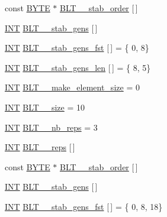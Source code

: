 \begin{DoxyCompactItemize}
\item 
const \mbox{\hyperlink{galois_8h_ab6cc7b4aeb6ea31aba2b3fbfc83ff5e6}{B\+Y\+TE}} $\ast$ \mbox{\hyperlink{data___b_l_t_8_c_ac40c9bb4cbdc0a4b06b5f1a78fd41d98}{B\+L\+T\+\_\+\_\+stab\+\_\+order}} \mbox{[}$\,$\mbox{]}
\item 
\mbox{\hyperlink{galois_8h_a09fddde158a3a20bd2dcadb609de11dc}{I\+NT}} \mbox{\hyperlink{data___b_l_t_8_c_a3fb92cc808370f49340f142bbf36ec7f}{B\+L\+T\+\_\+\_\+stab\+\_\+gens}} \mbox{[}$\,$\mbox{]}
\item 
\mbox{\hyperlink{galois_8h_a09fddde158a3a20bd2dcadb609de11dc}{I\+NT}} \mbox{\hyperlink{data___b_l_t_8_c_a8258b0ac3f8f81c167388f524f555fca}{B\+L\+T\+\_\+\_\+stab\+\_\+gens\+\_\+fst}} \mbox{[}$\,$\mbox{]} = \{ 0, 8\}
\item 
\mbox{\hyperlink{galois_8h_a09fddde158a3a20bd2dcadb609de11dc}{I\+NT}} \mbox{\hyperlink{data___b_l_t_8_c_ae59534edf360e5227e733fb527f6b971}{B\+L\+T\+\_\+\_\+stab\+\_\+gens\+\_\+len}} \mbox{[}$\,$\mbox{]} = \{ 8, 5\}
\item 
\mbox{\hyperlink{galois_8h_a09fddde158a3a20bd2dcadb609de11dc}{I\+NT}} \mbox{\hyperlink{data___b_l_t_8_c_a8f5fa3e962da852a3a3a9c143325fb2e}{B\+L\+T\+\_\+\_\+make\+\_\+element\+\_\+size}} = 0
\item 
\mbox{\hyperlink{galois_8h_a09fddde158a3a20bd2dcadb609de11dc}{I\+NT}} \mbox{\hyperlink{data___b_l_t_8_c_a836c81e945cdd841f5aa6fa9dea8e361}{B\+L\+T\+\_\+\_\+size}} = 10
\item 
\mbox{\hyperlink{galois_8h_a09fddde158a3a20bd2dcadb609de11dc}{I\+NT}} \mbox{\hyperlink{data___b_l_t_8_c_a71be27a7d991f6ae8c6afd434f7956a0}{B\+L\+T\+\_\+\_\+nb\+\_\+reps}} = 3
\item 
\mbox{\hyperlink{galois_8h_a09fddde158a3a20bd2dcadb609de11dc}{I\+NT}} \mbox{\hyperlink{data___b_l_t_8_c_a31f843c98bdcc9cc876d5a76ff936aa7}{B\+L\+T\+\_\+\_\+reps}} \mbox{[}$\,$\mbox{]}
\item 
const \mbox{\hyperlink{galois_8h_ab6cc7b4aeb6ea31aba2b3fbfc83ff5e6}{B\+Y\+TE}} $\ast$ \mbox{\hyperlink{data___b_l_t_8_c_a4b19518d7ae3431e6166ef95add20fef}{B\+L\+T\+\_\+\_\+stab\+\_\+order}} \mbox{[}$\,$\mbox{]}
\item 
\mbox{\hyperlink{galois_8h_a09fddde158a3a20bd2dcadb609de11dc}{I\+NT}} \mbox{\hyperlink{data___b_l_t_8_c_ac0f46ae6f195a0314839d21adf419881}{B\+L\+T\+\_\+\_\+stab\+\_\+gens}} \mbox{[}$\,$\mbox{]}
\item 
\mbox{\hyperlink{galois_8h_a09fddde158a3a20bd2dcadb609de11dc}{I\+NT}} \mbox{\hyperlink{data___b_l_t_8_c_afa8a33351abec7e9c6e541fddf23683f}{B\+L\+T\+\_\+\_\+stab\+\_\+gens\+\_\+fst}} \mbox{[}$\,$\mbox{]} = \{ 0, 8, 18\}

\end{DoxyCompactItemize}
